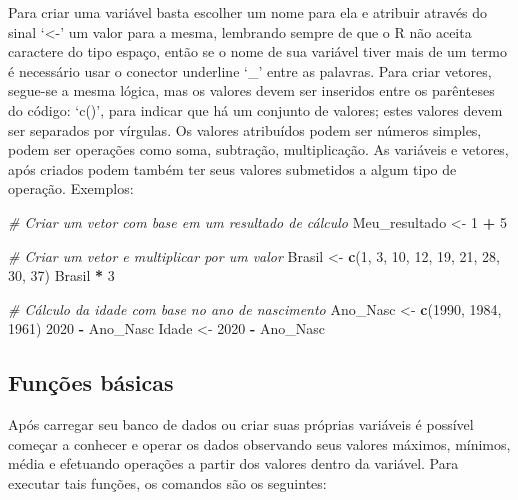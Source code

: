 \documentclass[
  brazil,
]{book}
\newenvironment{Shaded}{\begin{snugshade}}{\end{snugshade}}
\newcommand{\CommentTok}[1]{\textcolor[rgb]{0.56,0.35,0.01}{\textit{#1}}}
\newcommand{\DecValTok}[1]{\textcolor[rgb]{0.00,0.00,0.81}{#1}}
\newcommand{\KeywordTok}[1]{\textcolor[rgb]{0.13,0.29,0.53}{\textbf{#1}}}
\newcommand{\NormalTok}[1]{#1}
\newcommand{\OperatorTok}[1]{\textcolor[rgb]{0.81,0.36,0.00}{\textbf{#1}}}
\newcommand{\StringTok}[1]{\textcolor[rgb]{0.31,0.60,0.02}{#1}}
\begin{document}
Para criar uma variável basta escolher um nome para ela e atribuir através do sinal `\textless-' um valor para a mesma, lembrando sempre de que o R não aceita caractere do tipo espaço, então se o nome de sua variável tiver mais de um termo é necessário usar o conector underline `\_' entre as palavras. Para criar vetores, segue-se a mesma lógica, mas os valores devem ser inseridos entre os parênteses do código: `c()', para indicar que há um conjunto de valores; estes valores devem ser separados por vírgulas. Os valores atribuídos podem ser números simples, podem ser operações como soma, subtração, multiplicação. As variáveis e vetores, após criados podem também ter seus valores submetidos a algum tipo de operação. Exemplos:

\begin{Shaded}
\begin{Highlighting}[]
\CommentTok{# Criar um vetor com base em um resultado de cálculo}
\NormalTok{Meu_resultado <-}\StringTok{ }\DecValTok{1} \OperatorTok{+}\StringTok{ }\DecValTok{5}

\CommentTok{# Criar um vetor e multiplicar por um valor}
\NormalTok{Brasil <-}\StringTok{ }\KeywordTok{c}\NormalTok{(}\DecValTok{1}\NormalTok{, }\DecValTok{3}\NormalTok{, }\DecValTok{10}\NormalTok{, }\DecValTok{12}\NormalTok{, }\DecValTok{19}\NormalTok{, }\DecValTok{21}\NormalTok{, }\DecValTok{28}\NormalTok{, }\DecValTok{30}\NormalTok{, }\DecValTok{37}\NormalTok{)}
\NormalTok{Brasil }\OperatorTok{*}\StringTok{ }\DecValTok{3}

\CommentTok{# Cálculo da idade com base no ano de nascimento}
\NormalTok{Ano_Nasc <-}\StringTok{ }\KeywordTok{c}\NormalTok{(}\DecValTok{1990}\NormalTok{, }\DecValTok{1984}\NormalTok{, }\DecValTok{1961}\NormalTok{)}
\DecValTok{2020} \OperatorTok{-}\StringTok{ }\NormalTok{Ano_Nasc}
\NormalTok{Idade <-}\StringTok{ }\DecValTok{2020} \OperatorTok{-}\StringTok{ }\NormalTok{Ano_Nasc}
\end{Highlighting}
\end{Shaded}

\hypertarget{funuxe7uxf5es-buxe1sicas}{%
\subsection{Funções básicas}\label{funuxe7uxf5es-buxe1sicas}}

Após carregar seu banco de dados ou criar suas próprias variáveis é possível começar a conhecer e operar os dados observando seus valores máximos, mínimos, média e efetuando operações a partir dos valores dentro da variável. Para executar tais funções, os comandos são os seguintes:
\end{document}
